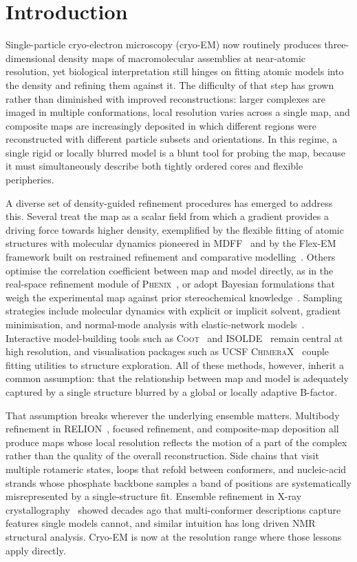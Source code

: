 \documentclass[11pt]{article}
\begin{document}
\section{Introduction}
Single-particle cryo-electron microscopy (cryo-EM) now routinely produces three-dimensional density maps of macromolecular assemblies at near-atomic resolution, yet biological interpretation still hinges on fitting atomic models into the density and refining them against it. The difficulty of that step has grown rather than diminished with improved reconstructions: larger complexes are imaged in multiple conformations, local resolution varies across a single map, and composite maps are increasingly deposited in which different regions were reconstructed with different particle subsets and orientations. In this regime, a single rigid or locally blurred model is a blunt tool for probing the map, because it must simultaneously describe both tightly ordered cores and flexible peripheries.

A diverse set of density-guided refinement procedures has emerged to address this. Several treat the map as a scalar field from which a gradient provides a driving force towards higher density, exemplified by the flexible fitting of atomic structures with molecular dynamics pioneered in MDFF~\cite{trabuco2008} and by the Flex-EM framework built on restrained refinement and comparative modelling~\cite{topf2008}. Others optimise the correlation coefficient between map and model directly, as in the real-space refinement module of \textsc{Phenix}~\cite{afonine2018,liebschner2019}, or adopt Bayesian formulations that weigh the experimental map against prior stereochemical knowledge~\cite{bonomi2018}. Sampling strategies include molecular dynamics with explicit or implicit solvent, gradient minimisation, and normal-mode analysis with elastic-network models~\cite{tama2004}. Interactive model-building tools such as \textsc{Coot}~\cite{emsley2010} and \textsc{ISOLDE}~\cite{croll2018} remain central at high resolution, and visualisation packages such as \textsc{UCSF ChimeraX}~\cite{goddard2018,pettersen2021} couple fitting utilities to structure exploration. All of these methods, however, inherit a common assumption: that the relationship between map and model is adequately captured by a single structure blurred by a global or locally adaptive B-factor.

That assumption breaks wherever the underlying ensemble matters. Multibody refinement in \textsc{RELION}~\cite{nakane2018}, focused refinement, and composite-map deposition all produce maps whose local resolution reflects the motion of a part of the complex rather than the quality of the overall reconstruction. Side chains that visit multiple rotameric states, loops that refold between conformers, and nucleic-acid strands whose phosphate backbone samples a band of positions are systematically misrepresented by a single-structure fit. Ensemble refinement in X-ray crystallography~\cite{levin2007,burnley2012} showed decades ago that multi-conformer descriptions capture features single models cannot, and similar intuition has long driven NMR structural analysis. Cryo-EM is now at the resolution range where those lessons apply directly.
\end{document}
